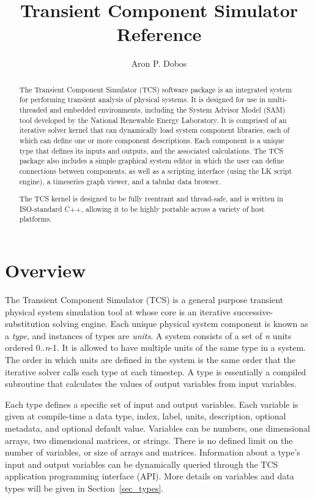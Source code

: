 \documentclass{article}
\title{Transient Component Simulator Reference}
\author{Aron P. Dobos}
\begin{document}
\maketitle
\vspace{3in}
\begin{abstract}
The Transient Component Simulator (TCS) software package is an integrated system for performing transient analysis of physical systems.  It is designed for use in multi-threaded and embedded environments, including the System Advisor Model (SAM) tool developed by the National Renewable Energy Laboratory.  It is comprised of an iterative solver kernel that can dynamically load system component libraries, each of which can define one or more component descriptions.  Each component is a unique type that defines its inputs and outputs, and the associated calculations.  The TCS package also includes a simple graphical system editor in which the user can define connections between components, as well as a scripting interface (using the LK script engine), a timeseries graph viewer, and a tabular data browser.

The TCS kernel is designed to be fully reentrant and thread-safe, and is written in ISO-standard C++, allowing it to be highly portable across a variety of host platforms.
\end{abstract} 

\newpage
\tableofcontents
\newpage

\section{Overview}

The Transient Component Simulator (TCS) is a general purpose transient physical system simulation tool at whose core is an iterative successive-substitution solving engine.  Each unique physical system component is known as a \emph{type}, and instances of types are \emph{units}.  A system consists of a set of \emph{n} units ordered 0..\emph{n}-1.  It is allowed to have multiple units of the same type in a system.  The order in which units are defined in the system is the same order that the iterative solver calls each type at each timestep.  A type is essentially a compiled subroutine that calculates the values of output variables from input variables.

Each type defines a specific set of input and output variables.  Each variable is given at compile-time a data type, index, label, units, description, optional metadata, and optional default value.  Variables can be numbers, one dimensional arrays, two dimensional matrices, or strings.  There is no defined limit on the number of variables, or size of arrays and matrices.  Information about a type's input and output variables can be dynamically queried through the TCS application programming interface (API).  More details on variables and data types will be given in Section~\ref{sec_types}.
\end{document}
